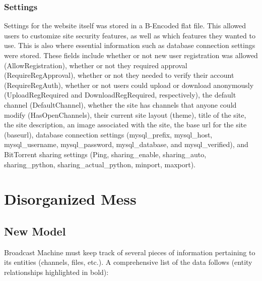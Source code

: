 \documentclass[a4paper,12pt]{report}
\begin{document}
\subsection{Settings}
Settings for the website itself was stored in a B-Encoded flat file. This allowed users to customize site security features, as well as which features they wanted to use. This is also where essential information such as database connection settings were stored. These fields include whether or not new user registration was allowed (AllowRegistration), whether or not they required approval (RequireRegApproval), whether or not they needed to verify their account (RequireRegAuth), whether or not users could upload or download anonymously (UploadRegRequired and DownloadRegRequired, respectively), the default channel (DefaultChannel), whether the site has channels that anyone could modify (HasOpenChannels), their current site layout (theme), title of the site, the site description, an image associated with the site, the base url for the site (baseurl), database connection settings (mysql\_prefix, mysql\_host, mysql\_username, mysql\_password, mysql\_database, and mysql\_verified), and BitTorrent sharing settings (Ping, sharing\_enable, sharing\_auto, sharing\_python, sharing\_actual\_python, minport, maxport).

\chapter{Disorganized Mess}
\section{New Model}
Broadcast Machine must keep track of several pieces of information pertaining to its entities (channels, files, etc.).
A comprehensive list of the data follows (entity relationships highlighted in bold):
\end{document}
